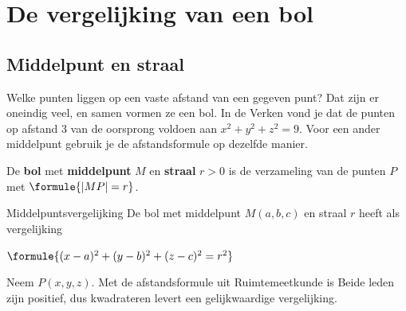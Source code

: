 \begin{oefeningen}[Start]

\end{oefeningen}

\section{De vergelijking van een bol}

\subsection{Middelpunt en straal}

Welke punten liggen op een vaste afstand van een gegeven punt? Dat zijn er oneindig veel, en samen vormen ze een bol. In de Verken vond je dat de punten op afstand 3 van de oorsprong voldoen aan $x^2 + y^2 + z^2 = 9$. Voor een ander middelpunt gebruik je de afstandsformule op dezelfde manier.

\begin{theorie}
\begin{minipage}[t]{.64\linewidth}
\vspace{0pt}
De \textbf{\textcolor{accent}{bol}} met \textbf{\textcolor{accent}{middelpunt}} $M$ en \textbf{\textcolor{accent}{straal}} $r > 0$ is de verzameling van de punten $P$ met $\formule{|MP| = r}$.

\begin{stelling}{Middelpuntsvergelijking}
De bol met middelpunt $M(a, b, c)$ en straal $r$ heeft als vergelijking

\vspace{1mm}
\qquad $\formule{(x - a)^2 + (y - b)^2 + (z - c)^2 = r^2}$
\end{stelling}
\end{minipage}\hfill
\begin{minipage}[t]{.32\linewidth}
\vspace{0pt}
\centering
{}
\end{minipage}

\begin{bewijs}
Neem $P(x, y, z)$. Met de afstandsformule uit Ruimtemeetkunde is
Beide leden zijn positief, dus kwadrateren levert een gelijkwaardige vergelijking.
\end{bewijs}
\end{theorie}

